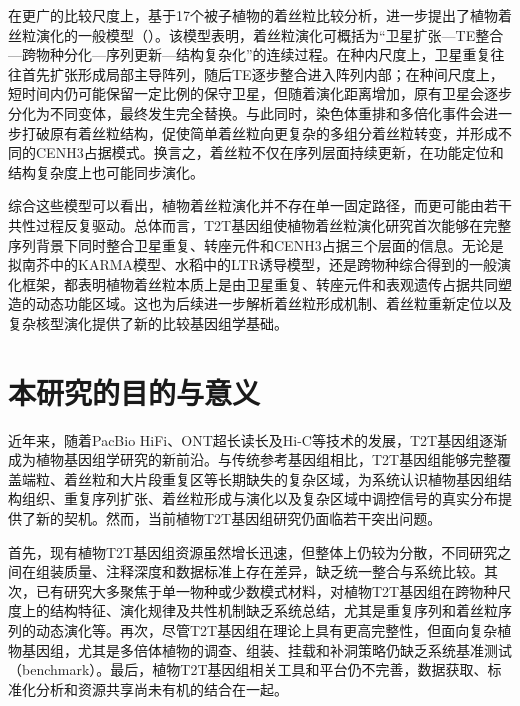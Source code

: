在更广的比较尺度上，基于17个被子植物的着丝粒比较分析，进一步提出了植物着丝粒演化的一般模型（）\cite{huang2026evolutionary}。该模型表明，着丝粒演化可概括为“卫星扩张—TE整合—跨物种分化—序列更新—结构复杂化”的连续过程。在种内尺度上，卫星重复往往首先扩张形成局部主导阵列，随后TE逐步整合进入阵列内部；在种间尺度上，短时间内仍可能保留一定比例的保守卫星，但随着演化距离增加，原有卫星会逐步分化为不同变体，最终发生完全替换。与此同时，染色体重排和多倍化事件会进一步打破原有着丝粒结构，促使简单着丝粒向更复杂的多组分着丝粒转变，并形成不同的CENH3占据模式。换言之，着丝粒不仅在序列层面持续更新，在功能定位和结构复杂度上也可能同步演化。

综合这些模型可以看出，植物着丝粒演化并不存在单一固定路径，而更可能由若干共性过程反复驱动。总体而言，T2T基因组使植物着丝粒演化研究首次能够在完整序列背景下同时整合卫星重复、转座元件和CENH3占据三个层面的信息。无论是拟南芥中的KARMA模型、水稻中的LTR诱导模型，还是跨物种综合得到的一般演化框架，都表明植物着丝粒本质上是由卫星重复、转座元件和表观遗传占据共同塑造的动态功能区域。这也为后续进一步解析着丝粒形成机制、着丝粒重新定位以及复杂核型演化提供了新的比较基因组学基础。

\section{本研究的目的与意义}

近年来，随着PacBio HiFi、ONT超长读长及Hi-C等技术的发展，T2T基因组逐渐成为植物基因组学研究的新前沿。与传统参考基因组相比，T2T基因组能够完整覆盖端粒、着丝粒和大片段重复区等长期缺失的复杂区域，为系统认识植物基因组结构组织、重复序列扩张、着丝粒形成与演化以及复杂区域中调控信号的真实分布提供了新的契机。然而，当前植物T2T基因组研究仍面临若干突出问题。

首先，现有植物T2T基因组资源虽然增长迅速，但整体上仍较为分散，不同研究之间在组装质量、注释深度和数据标准上存在差异，缺乏统一整合与系统比较。其次，已有研究大多聚焦于单一物种或少数模式材料，对植物T2T基因组在跨物种尺度上的结构特征、演化规律及共性机制缺乏系统总结，尤其是重复序列和着丝粒序列的动态演化等。再次，尽管T2T基因组在理论上具有更高完整性，但面向复杂植物基因组，尤其是多倍体植物的调查、组装、挂载和补洞策略仍缺乏系统基准测试（benchmark）。最后，植物T2T基因组相关工具和平台仍不完善，数据获取、标准化分析和资源共享尚未有机的结合在一起。

